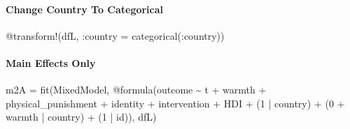 \documentclass[
  letterpaper,
  DIV=11,
  numbers=noendperiod]{scrreprt}
\let\oldparagraph\paragraph
\renewcommand{\paragraph}[1]{\oldparagraph{#1}\mbox{}}
\newenvironment{Shaded}{\begin{snugshade}}{\end{snugshade}}
\newcommand{\FloatTok}[1]{\textcolor[rgb]{0.68,0.00,0.00}{#1}}
\newcommand{\FunctionTok}[1]{\textcolor[rgb]{0.28,0.35,0.67}{#1}}
\newcommand{\NormalTok}[1]{\textcolor[rgb]{0.00,0.23,0.31}{#1}}
\newcommand{\OperatorTok}[1]{\textcolor[rgb]{0.37,0.37,0.37}{#1}}
\newcommand{\PreprocessorTok}[1]{\textcolor[rgb]{0.68,0.00,0.00}{#1}}
\begin{document}
\paragraph{Change Country To
Categorical}\label{change-country-to-categorical-1}

\begin{Shaded}
\begin{Highlighting}[]
\PreprocessorTok{@transform}\NormalTok{!(dfL, }\OperatorTok{:}\NormalTok{country }\OperatorTok{=} \FunctionTok{categorical}\NormalTok{(}\OperatorTok{:}\NormalTok{country))}
\end{Highlighting}
\end{Shaded}

\paragraph{Main Effects Only}\label{main-effects-only-2}

\begin{Shaded}
\begin{Highlighting}[]
\NormalTok{m2A }\OperatorTok{=} \FunctionTok{fit}\NormalTok{(MixedModel, }\PreprocessorTok{@formula}\NormalTok{(outcome }\OperatorTok{\textasciitilde{}}\NormalTok{ t }\OperatorTok{+}\NormalTok{ warmth }\OperatorTok{+} 
\NormalTok{                                 physical\_punishment }\OperatorTok{+} 
\NormalTok{                                 identity }\OperatorTok{+}\NormalTok{ intervention }\OperatorTok{+} 
\NormalTok{                                 HDI }\OperatorTok{+}
\NormalTok{                                 (}\FloatTok{1} \OperatorTok{|}\NormalTok{ country) }\OperatorTok{+} 
\NormalTok{                                 (}\FloatTok{0} \OperatorTok{+}\NormalTok{ warmth }\OperatorTok{|}\NormalTok{ country) }\OperatorTok{+}
\NormalTok{                                 (}\FloatTok{1} \OperatorTok{|}\NormalTok{ id)), dfL)}
\end{Highlighting}
\end{Shaded}
\end{document}
